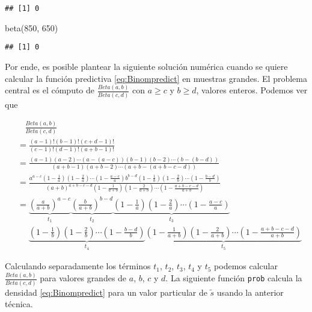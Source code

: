 \documentclass[
  12pt,
  spanish,
]{book}
\newenvironment{Shaded}{\begin{snugshade}}{\end{snugshade}}
\newcommand{\DecValTok}[1]{\textcolor[rgb]{0.00,0.00,0.81}{#1}}
\newcommand{\FunctionTok}[1]{\textcolor[rgb]{0.00,0.00,0.00}{#1}}
\newcommand{\NormalTok}[1]{#1}
\theoremstyle{definition}
\theoremstyle{definition}
\theoremstyle{definition}
\theoremstyle{definition}
\theoremstyle{remark}
\begin{document}
\begin{verbatim}
## [1] 0
\end{verbatim}

\begin{Shaded}
\begin{Highlighting}[]
\FunctionTok{beta}\NormalTok{(}\DecValTok{850}\NormalTok{, }\DecValTok{650}\NormalTok{)}
\end{Highlighting}
\end{Shaded}

\begin{verbatim}
## [1] 0
\end{verbatim}

Por ende, es posible plantear la
siguiente solución numérica cuando se quiere calcular la función
predictiva \eqref{eq:Binompredict} en muestras grandes. El problema
central es el cómputo de \(\frac{Beta(a,b)}{Beta(c,d)}\) con \(a \geq c\) y
\(b \geq d\), valores enteros. Podemos ver que

\begin{align*}
&\ \ \ \ \frac{Beta(a,b)}{Beta(c,d)}\\
&=\frac{(a-1)!(b-1)!(c+d-1)!}{(c-1)!(d-1)!(a+b-1)!}\\
&=\frac{(a-1)(a-2)\cdots(a-(a-c))(b-1)(b-2)\cdots(b-(b-d))}{(a+b-1)(a+b-2)\cdots(a+b-(a+b-c-d))}\\
&=\frac{a^{a-c}(1-\frac{1}{a})(1-\frac{2}{a})\cdots(1-\frac{a-c}{a})b^{b-d}(1-\frac{1}{b})(1-\frac{2}{b})\cdots(1-\frac{b-d}{b})}{(a+b)^{a+b-c-d}(1-\frac{1}{a+b})(1-\frac{2}{a+b})\cdots(1-\frac{a+b-c-d}{a+b})}\\
&=\underbrace{\left(\frac{a}{a+b}\right)^{a-c}}_{t_1}\underbrace{\left(\frac{b}{a+b}\right)^{b-d}}_{t_2}\underbrace{(1-\frac{1}{a})(1-\frac{2}{a})\cdots(1-\frac{a-c}{a})}_{t_3}\\
&\ \ \ \ \ \ \underbrace{(1-\frac{1}{b})(1-\frac{2}{b})\cdots(1-\frac{b-d}{b})}_{t_4}\underbrace{(1-\frac{1}{a+b})(1-\frac{2}{a+b})\cdots(1-\frac{a+b-c-d}{a+b})}_{t_5}
\end{align*}

Calculando separadamente los términos \(t_1\), \(t_2\), \(t_3\), \(t_4\) y \(t_5\)
podemos calcular \(\frac{Beta(a,b)}{Beta(c,d)}\) para valores grandes de
\(a\), \(b\), \(c\) y \(d\). La siguiente función \texttt{prob} calcula la
densidad \eqref{eq:Binompredict} para un valor particular de \(\tilde{s}\)
usando la anterior técnica.
\end{document}

